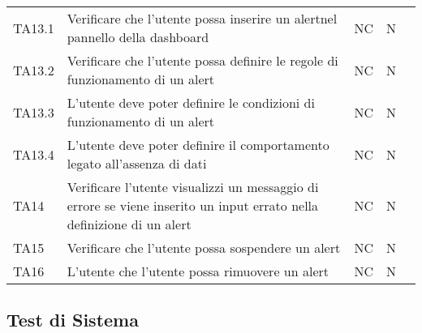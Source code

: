 \begin{longtable} {
		>{\centering}p{15mm} 
		>{\centering}p{79.5mm}
		>{\centering}p{10mm} 
		>{\centering}p{10mm}
		>{}p{0mm}}
	TA13.1 & Verificare che l'utente possa inserire un alert\glosp nel pannello della dashboard\glo & NC & N  &\TBstrut \\ [2mm]
	TA13.2 & Verificare che l'utente possa definire le regole di funzionamento di un alert\glo & NC & N  &\TBstrut \\ [2mm]
	TA13.3 & L'utente deve poter definire le condizioni di funzionamento di un alert\glo & NC & N  &\TBstrut \\ [2mm]
	TA13.4 & L'utente deve poter definire il comportamento legato all'assenza di dati  & NC & N  &\TBstrut \\ [2mm]
	TA14 & Verificare l'utente visualizzi un messaggio di errore se viene inserito un input errato nella definizione di un alert\glo & NC & N  &\TBstrut \\ [2mm]
	TA15 & Verificare che l'utente possa sospendere un alert\glo & NC & N  &\TBstrut \\ [2mm]
	TA16 & L'utente che l'utente possa rimuovere un alert\glo & NC & N  &\TBstrut \\ [2mm]
	
\end{longtable}


\subsection{Test di Sistema}

